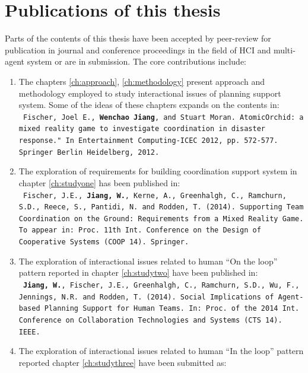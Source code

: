 \section{Publications of this thesis} 
Parts of the contents of this thesis have been accepted by peer-review for publication in journal and conference proceedings in the field of \ac{HCI} and multi-agent system or are in submission. The core contributions include: \\


\begin{enumerate}
\item The chapters \ref{ch:approach}, \ref{ch:methodology}  present approach and methodology employed to study interactional issues of planning support system. Some of the ideas of these chapters expands on the contents in:\\
\texttt{ \footnotesize Fischer, Joel E., \textbf{Wenchao Jiang}, and Stuart Moran. AtomicOrchid: a mixed reality game to investigate coordination in disaster response." In Entertainment Computing-ICEC 2012, pp. 572-577. Springer Berlin Heidelberg, 2012.}\\

\item The exploration of requirements for building coordination support system in chapter \ref{ch:studyone}  has been published in:\\
\texttt{ \footnotesize Fischer, J.E., \textbf{Jiang, W.}, Kerne, A., Greenhalgh, C., Ramchurn, S.D., Reece, S., Pantidi, N. and Rodden, T. (2014). Supporting Team Coordination on the Ground: Requirements from a Mixed Reality Game. To appear in: Proc. 11th Int. Conference on the Design of Cooperative Systems (COOP 14). Springer.}\\


\item The exploration of interactional issues related to human ``On the loop'' pattern reported in chapter \ref{ch:studytwo} have been published in:\\
\texttt{ \footnotesize\textbf{Jiang, W.}, Fischer, J.E., Greenhalgh, C., Ramchurn, S.D., Wu, F., Jennings, N.R. and Rodden, T. (2014). Social Implications of Agent-based Planning Support for Human Teams.  In: Proc. of the 2014 Int. Conference on Collaboration Technologies and Systems (CTS 14). IEEE.}

\item The exploration of interactional issues related to human ``In the loop'' pattern reported chapter \ref{ch:studythree} have been submitted as:\\



\end{enumerate}

